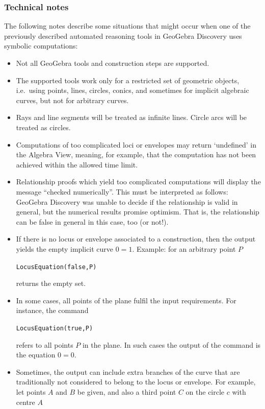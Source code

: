 \documentclass{article}
\begin{document}
\subsubsection{Technical notes}
\label{sec:TechnicalNotes}

The following notes describe some situations that might occur when one of the previously described automated reasoning tools in GeoGebra Discovery uses symbolic computations:
\begin{itemize}
\item Not all GeoGebra tools and construction steps are supported.
\item The supported tools work only for a restricted set of geometric objects, i.e.~using points, lines, circles, conics, and sometimes for implicit algebraic curves, but not for arbitrary curves.
\item Rays and line segments will be treated as infinite lines. Circle arcs will be treated as circles.
\item Computations of too complicated loci or envelopes may return `undefined' in the Algebra View, meaning, for example, that the computation has not been achieved within the allowed time limit.
\item Relationship proofs which yield too complicated computations will display the message ``checked numerically''. This must be
interpreted as follows: GeoGebra Discovery was unable to decide if the relationship is valid in general, but the numerical results promise optimism.
That is, the relationship can be false in general in this case, too (or not!).
\item If there is no locus or envelope associated to a construction, then the output yields the empty implicit curve $0=1$. Example: for an arbitrary point $P$
\begin{center}
\texttt{LocusEquation(false,P)}
\end{center}
returns the empty set.
\item In some cases, all points of the plane fulfil the input requirements. For instance, the command
\begin{center}
\texttt{LocusEquation(true,P)}
\end{center}
refers to all points $P$ in the plane. In such cases the output of the command is the equation $0=0$.
\item Sometimes, the output can include extra branches of the curve that are traditionally not considered to belong to the locus or envelope.
For example, let points $A$ and $B$ be given, and also a third point $C$ on the circle $c$ with centre $A$

\end{itemize}
\end{document}
